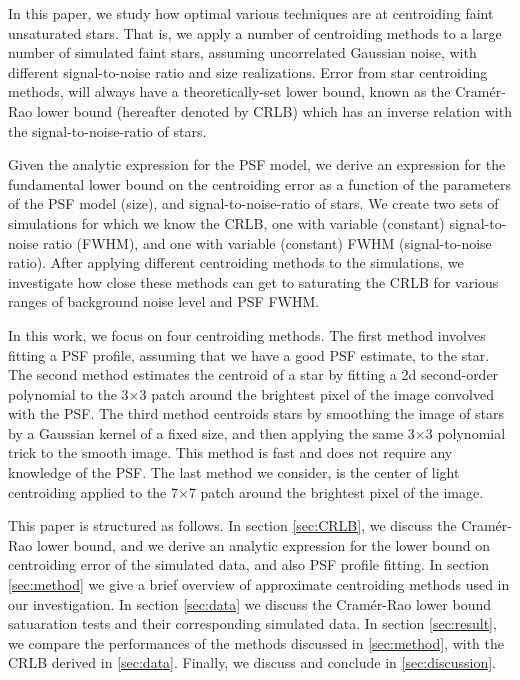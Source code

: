 \documentclass[12pt, preprint]{aastex}
\begin{document}
In this paper, we study how optimal various techniques are at centroiding 
faint unsaturated stars. That is, we apply a number of centroiding methods 
to a large number of simulated faint stars, assuming uncorrelated Gaussian noise, 
with different signal-to-noise ratio and size realizations. Error from star 
centroiding methods, will always have a theoretically-set lower bound, 
known as the Cram\'{e}r-Rao lower bound (hereafter denoted by CRLB) which 
has an inverse relation with the signal-to-noise-ratio of stars.

Given the analytic expression for the PSF model,
we derive an expression for the fundamental lower bound on the centroiding error as
a function of the parameters of the PSF model (\eg size),
and signal-to-noise-ratio of stars. We create two sets of simulations for which we 
know the CRLB, one with variable (constant) signal-to-noise ratio (FWHM), and one 
with variable (constant) FWHM (signal-to-noise ratio). After applying
different centroiding methods to the simulations,
we investigate how close these methods can get to saturating the CRLB for
various ranges of background noise level and PSF FWHM.

In this work, we focus on four centroiding methods. The first method
involves fitting a PSF profile, assuming that we have a good PSF estimate, to the star. 
The second method estimates the centroid of a star by fitting a 2d second-order polynomial to
 the 3$\times$3 patch around the brightest pixel of the image convolved with the PSF. 
The third method centroids stars by
 smoothing the image of stars by a Gaussian kernel of a fixed size,
 and then applying the same 3$\times$3 polynomial trick to the smooth
 image. This method is fast and does not require any knowledge of the 
PSF. The last method we consider, is the center of light centroiding applied to the
 7$\times$7 patch around the brightest pixel of the image.

This paper is structured as follows. In section \ref{sec:CRLB},
we discuss the Cram\'{e}r-Rao lower bound, and we derive
an analytic expression for the lower bound on centroiding error
of the simulated data, and also PSF profile fitting. 
In section \ref{sec:method} we give a brief overview of approximate 
centroiding methods used in our investigation.
In section \ref{sec:data} we discuss the Cram\'{e}r-Rao lower bound satuaration
tests and their corresponding simulated data.
In section \ref{sec:result}, we compare the performances of the methods
discussed in \ref{sec:method}, with the CRLB derived in \ref{sec:data}. Finally,
 we discuss and conclude in \ref{sec:discussion}.               
\end{document}
